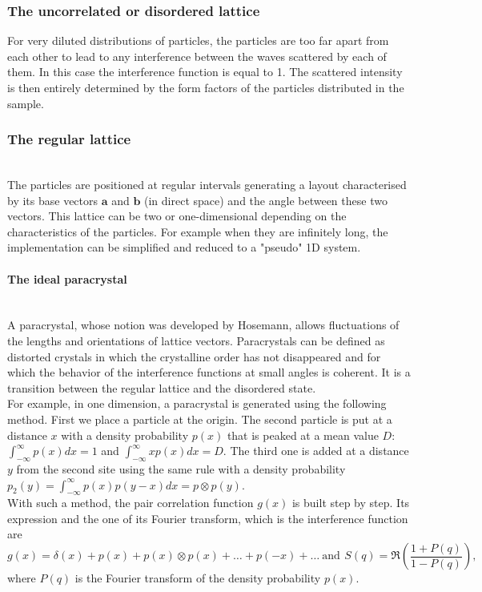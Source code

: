 \subsubsection{The uncorrelated or disordered lattice}
For very diluted distributions of particles, the particles are too far apart from each other to lead to any interference between the waves scattered by each of them. In this case the interference function is equal to 1. The scattered intensity is then entirely determined by the form factors of the particles distributed in the sample.

\subsubsection{The regular  lattice}\mbox{}\\
The particles are positioned at regular intervals generating a layout characterised by its base vectors $\mathbf{a}$ and $\mathbf{b}$ (in direct space) and the angle between these two vectors.
This lattice can be two or one-dimensional depending on the characteristics of the particles. For example when they are infinitely long, the implementation can be simplified and reduced to a "pseudo" 1D system.

\paragraph{The ideal paracrystal} \mbox{}\\
A paracrystal, whose notion  was developed by Hosemann\cite{Hos51}, allows fluctuations of the lengths and orientations of lattice vectors. Paracrystals can be defined as distorted crystals in which the crystalline order has not disappeared and for which the behavior of the interference functions  at small angles is coherent.
It is a transition between the regular lattice and the disordered state.\\


For example, in one dimension, a paracrystal is generated using the following method. First we place a particle at the origin. The second particle is put at a distance $x$ with a density probability $p(x)$ that is peaked at a mean value $D$: $\int_{-\infty} ^{\infty}p(x)dx=1$ and $\int_{-\infty}^{\infty}xp(x)dx=D$. The third one is added at a distance $y$ from the second site using the same rule with a density probability $p_2(y)= \int_{-\infty}^{\infty}p(x)p(y-x)dx=p\otimes p(y)$.\\ With such a method, the pair correlation function $g(x)$ is built step by step. Its expression and the one of its Fourier transform, which is the interference function are 
\begin{equation*}
g(x)=\delta(x)+ p(x)+ p(x)\otimes p(x)+\ldots + p(-x)+\ldots \: \mathrm{and}\:\, S(q)=\Re\left(\dfrac{1+P(q)}{1-P(q)}\right),
\end{equation*}
 where $P(q)$ is the Fourier transform of the density probability $p(x)$.\\

